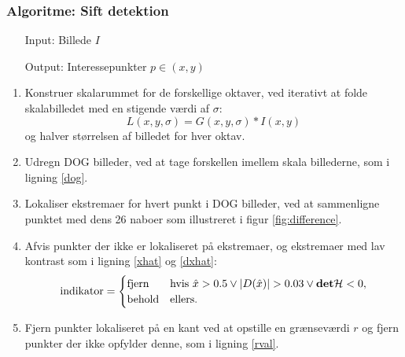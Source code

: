 \subsubsection{Algoritme: Sift detektion}
\begin{enumerate}
\item[Input:] Billede $I$
\item[Output:] Interessepunkter $p \in (x,y)$
\end{enumerate}
\begin{enumerate}
\item{Konstruer skalarummet for de forskellige oktaver, ved iterativt at folde skalabilledet med en stigende værdi af $\sigma$: $$ L(x,y,\sigma)= G(x,y,\sigma) \ast I(x,y) $$
og halver størrelsen af billedet for hver oktav.}
\item{Udregn DOG billeder, ved at tage forskellen imellem skala billederne, som i ligning \eqref{dog}.}
\item{Lokaliser ekstremaer for hvert punkt i DOG billeder, ved at sammenligne punktet med dens 26 naboer som illustreret i figur \ref{fig:difference}.}
\item{Afvis punkter der ikke er lokaliseret på ekstremaer, og ekstremaer med lav kontrast som i ligning \eqref{xhat} og \eqref{dxhat}:
\begin{equation}
\begin{split}
\text{indikator} = 
\begin{cases}
\text{fjern}& \text{hvis } \hat{x}>0.5 \lor |D(\hat{x})|>0.03 \lor \bold{det} \mathcal{H}<0 , \\
\text{behold}& \text{ellers}. 
\end{cases}
\end{split}
\label{maxsurp}
\end{equation}
}
\item{Fjern punkter lokaliseret på en kant ved at opstille en grænseværdi $r$ og fjern punkter der ikke opfylder denne, som i ligning \eqref{rval}.}
\end{enumerate}